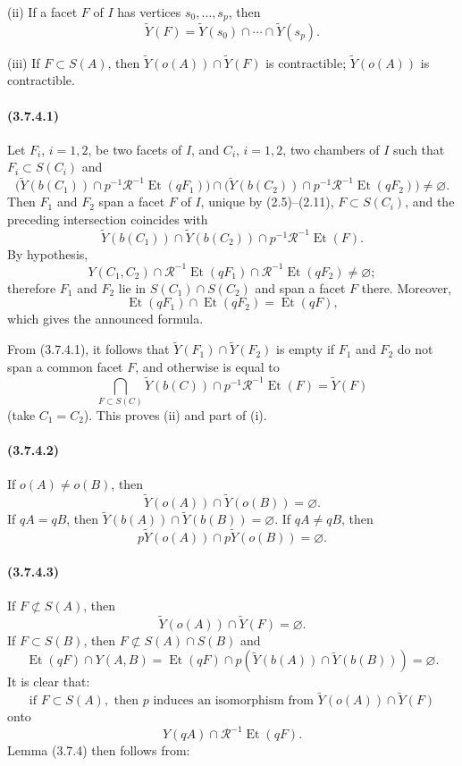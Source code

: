 \documentclass[10pt]{article}
\begin{document}
(ii) If a facet \(F\) of \(I\) has vertices \(s_0,\ldots,s_p\), then
\[
\widetilde Y(F)=\widetilde Y(s_0)\cap\cdots\cap\widetilde Y(s_p).
\]

(iii) If \(F\subset S(A)\), then \(\widetilde Y(o(A))\cap\widetilde Y(F)\) is contractible; \(\widetilde Y(o(A))\) is contractible.

\paragraph{(3.7.4.1)} Let \(F_i\), \(i=1,2\), be two facets of \(I\), and \(C_i\), \(i=1,2\), two chambers of \(I\) such that \(F_i\subset S(C_i)\) and
\[
\bigl(\widetilde Y(b(C_1))\cap p^{-1}\mathcal R^{-1}\operatorname{Et}(qF_1)\bigr)
\cap
\bigl(\widetilde Y(b(C_2))\cap p^{-1}\mathcal R^{-1}\operatorname{Et}(qF_2)\bigr)
\ne\varnothing.
\]
Then \(F_1\) and \(F_2\) span a facet \(F\) of \(I\), unique by (2.5)--(2.11), \(F\subset S(C_i)\), and the preceding intersection coincides with
\[
\widetilde Y(b(C_1))\cap \widetilde Y(b(C_2))
\cap p^{-1}\mathcal R^{-1}\operatorname{Et}(F).
\]
By hypothesis,
\[
Y(C_1,C_2)\cap\mathcal R^{-1}\operatorname{Et}(qF_1)\cap
\mathcal R^{-1}\operatorname{Et}(qF_2)\ne\varnothing;
\]
therefore \(F_1\) and \(F_2\) lie in \(S(C_1)\cap S(C_2)\) and span a facet \(F\) there. Moreover,
\[
\operatorname{Et}(qF_1)\cap\operatorname{Et}(qF_2)=\operatorname{Et}(qF),
\]
which gives the announced formula.

From (3.7.4.1), it follows that \(\widetilde Y(F_1)\cap\widetilde Y(F_2)\) is empty if \(F_1\) and \(F_2\) do not span a common facet \(F\), and otherwise is equal to
\[
\bigcap_{F\subset S(C)}
\widetilde Y(b(C))\cap p^{-1}\mathcal R^{-1}\operatorname{Et}(F)
=\widetilde Y(F)
\]
(take \(C_1=C_2\)). This proves (ii) and part of (i).

\paragraph{(3.7.4.2)} If \(o(A)\ne o(B)\), then
\[
\widetilde Y(o(A))\cap\widetilde Y(o(B))=\varnothing.
\]
If \(qA=qB\), then \(\widetilde Y(b(A))\cap \widetilde Y(b(B))=\varnothing\). If \(qA\ne qB\), then
\[
p\widetilde Y(o(A))\cap p\widetilde Y(o(B))=\varnothing.
\]

\paragraph{(3.7.4.3)} If \(F\not\subset S(A)\), then
\[
\widetilde Y(o(A))\cap\widetilde Y(F)=\varnothing.
\]
If \(F\subset S(B)\), then \(F\not\subset S(A)\cap S(B)\) and
\[
\operatorname{Et}(qF)\cap Y(A,B)
=\operatorname{Et}(qF)\cap p(\widetilde Y(b(A))\cap\widetilde Y(b(B)))=\varnothing.
\]
It is clear that:
\[
\tag{3.7.4.4}
\text{if }F\subset S(A),\text{ then }p\text{ induces an isomorphism from }
\widetilde Y(o(A))\cap\widetilde Y(F)
\]
onto
\[
Y(qA)\cap\mathcal R^{-1}\operatorname{Et}(qF).
\]
Lemma (3.7.4) then follows from:
\end{document}
